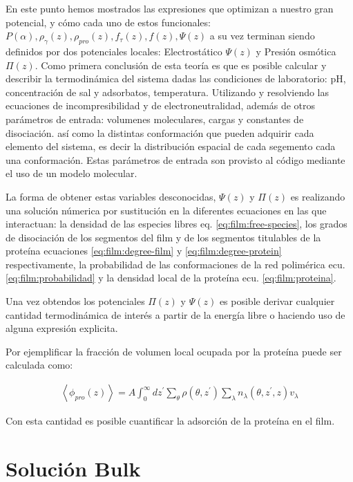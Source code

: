 En este punto hemos mostrados las expresiones que optimizan a nuestro gran potencial, y c\'omo cada uno de estos funcionales: $P(\alpha), \rho_\gamma(z),\rho_{pro}(z), f_\tau(z), f(z), \Psi(z) $ a su vez  terminan siendo definidos por dos potenciales locales: Electrost\'atico $\Psi(z)$ y Presi\'on osm\'otica $\Pi(z)$. 
Como primera conclusi\'on de esta teor\'ia es que es posible calcular y describir la termodin\'amica del sistema dadas las condiciones de laboratorio: pH, concentraci\'on de sal y adsorbatos, temperatura. Utilizando y resolviendo las ecuaciones de incompresibilidad y de electroneutralidad, adem\'as de otros par\'ametros de entrada: volumenes moleculares, cargas y constantes de disociaci\'on. as\'i como la distintas conformaci\'on que pueden adquirir cada elemento del sistema, es decir la distribuci\'on espacial de cada segemento cada una conformaci\'on.
Estas par\'ametros de entrada son provisto al c\'odigo mediante el uso de un modelo molecular. 

La forma de obtener estas variables desconocidas, $\Psi(z)$ y $\Pi(z)$  es realizando una soluci\'on n\'umerica por sustituci\'on en la diferentes ecuaciones en las que interactuan: la densidad de las especies libres eq. \ref{eq:film:free-species}, los grados de disociaci\'on de los segmentos del film y de los segmentos titulables de la prote\'ina ecuaciones \ref{eq:film:degree-film} y \ref{eq:film:degree-protein} respectivamente, la probabilidad de las conformaciones de la red polim\'erica ecu. \ref{eq:film:probabilidad} y la densidad local de la prote\'ina ecu. \ref{eq:film:proteina}.

Una vez obtendos los potenciales $\Pi(z)$ y $\Psi(z)$ es posible derivar  cualquier cantidad termodin\'amica de inter\'es  a partir de la energ\'ia libre o haciendo uso de alguna expresi\'on explicita. 

Por ejemplificar la fracci\'on de volumen local ocupada por la prote\'ina puede ser calculada como:

\begin{align}
	\left< \phi_{pro}(z) \right> = A\int_0^\infty dz^\prime \sum_\theta \rho(\theta, z^\prime)\sum_\lambda n_\lambda(\theta, z^\prime, z)v_\lambda
\end{align}

Con esta cantidad es posible cuantificar la adsorci\'on de la prote\'ina en el film. 

\section{Soluci\'on Bulk}\label{sec:film:bulk-solution}

